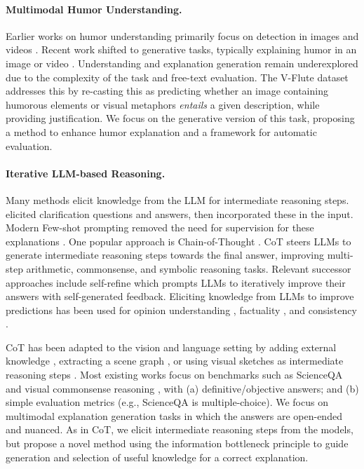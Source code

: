 \paragraph{Multimodal Humor Understanding.} Earlier works on humor understanding primarily focus on detection in images and videos \cite{Chandrasekaran_2016_CVPR, castro-etal-2019-towards, patro-humor}. 
Recent work shifted to generative tasks, typically explaining humor in an image \cite{hwang-shwartz-2023-memecap, hessel-etal-2023-androids, nandy-etal-2024-yesbut} or video \cite{smile, hasan-etal-2019-ur}. Understanding and explanation generation remain underexplored due to the complexity of the task and free-text evaluation. The V-Flute dataset \cite{vflute} addresses this by re-casting this as predicting whether an image containing humorous elements or visual metaphors \emph{entails} a given description, while providing justification. We focus on the generative version of this task, proposing a method to enhance humor explanation and a framework for automatic evaluation.


\paragraph{Iterative LLM-based Reasoning.} Many methods elicit knowledge from the LLM for intermediate reasoning steps.  
\citet{shwartz-etal-2020-unsupervised} elicited clarification questions and answers, then incorporated these in the input. Modern Few-shot prompting removed the need for supervision for these explanations \cite{marasovic-etal-2022-shot,wiegreffe-etal-2022-reframing}. One popular approach is Chain-of-Thought \cite[CoT;][]{cot}. CoT steers LLMs to generate intermediate reasoning steps towards the final answer, improving multi-step arithmetic, commonsense, and symbolic reasoning tasks. Relevant successor approaches include self-refine \cite{madaan2023selfrefine} which prompts LLMs to iteratively improve their answers with self-generated feedback. Eliciting knowledge from LLMs to improve predictions has been used for opinion understanding \cite{hwang-etal-2024-graph, hoyle-etal-2023-natural}, factuality \cite{akyurek-etal-2024-deductive}, and consistency \cite{liang-et-al-consistency}.

CoT has been adapted to the vision and language setting \cite{zhang2024multimodal} by adding external knowledge \cite{kam-cot}, extracting a scene graph \cite{MitraCCoT}, or using visual sketches as intermediate reasoning steps \cite{hu2024visual}. 
Most existing works focus on benchmarks such as ScienceQA \cite{scienceqa} and visual commonsense reasoning \cite{okvqa}, with (a) definitive/objective answers; and (b) simple evaluation metrics (e.g., ScienceQA is multiple-choice). We focus on multimodal explanation generation tasks in which the answers are open-ended and nuanced. As in CoT, we elicit intermediate reasoning steps from the models, but propose a novel method using the information bottleneck principle to guide generation and selection of useful knowledge for a correct explanation. 

